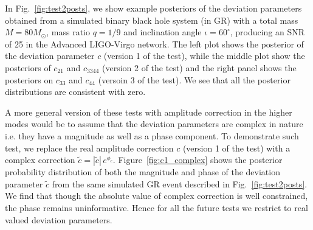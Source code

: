 \documentclass[prd,preprintnumbers,twocolumn,eqsecnum,floatfix,a4paper,nofootinbib,superscriptaddress]{revtex4}
\newcommand{\h}{\mathpzc{h}}
\newcommand{\blambda}{\bm{\lambda}}
\newcommand{\btheta}{\bm{\theta}}
\begin{document}


In Fig.~\ref{fig:test2posts}, we show example posteriors of the deviation parameters obtained from a simulated binary black hole system (in GR) with  a total mass $M = 80M_{\odot}$, mass ratio $q=1/9$ and inclination angle $ {\iota}=60^{\circ} $, producing an SNR of 25 in the Advanced LIGO-Virgo network. The left plot shows the posterior of the deviation parameter $c$ (version 1 of the test), while the middle plot show the posteriors of $c_{21}$ and $c_{3344}$ (version 2 of the test) and the right panel shows the posteriors on $c_{33}$ and $c_{44}$  (versoin 3 of the test). We see that all the posterior distributions are consistent with zero. 

A more general version of these tests with amplitude correction in the higher modes would be to assume that the deviation parameters are complex in nature i.e. they have a magnitude as well as a phase component. To demonstrate such test, we replace the real amplitude correction $c$ (version 1 of the test) with a complex correction $\tilde{c} = |\tilde{c}| \, e^{\phi_c}$. Figure~\ref{fig:c1_complex} shows the posterior probability distribution of both the magnitude and phase of the deviation parameter $\tilde{c}$ from the same simulated GR event described in Fig.~\ref{fig:test2posts}. We find that though the absolute value of complex correction is well constrained, the phase remains uninformative. Hence for all the future tests we restrict to real valued deviation parameters. 
\end{document}
